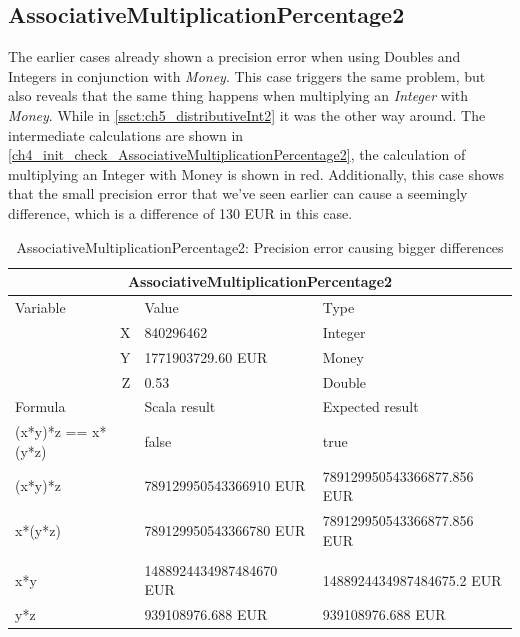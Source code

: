 \subsection{AssociativeMultiplicationPercentage2}
The earlier cases already shown a precision error when using Doubles and Integers in conjunction with \textit{Money}. This case triggers the same problem, but also reveals that the same thing happens when multiplying an \textit{Integer} with \textit{Money}. While in \autoref{ssct:ch5_distributiveInt2} it was the other way around. The intermediate calculations are shown in \autoref{ch4_init_check_AssociativeMultiplicationPercentage2}, the calculation of multiplying an Integer with Money is shown in red. Additionally, this case shows that the small precision error that we've seen earlier can cause a seemingly difference, which is a difference of 130 EUR in this case.
\\
\begin{table}[h!]
\centering
\begin{tabular}{lll}
\hline
\multicolumn{3}{|c|}{AssociativeMultiplicationPercentage2}                                                            \\ \hline
\multicolumn{1}{|l}{Variable}           & Value                   & \multicolumn{1}{l|}{Type}                       \\
\multicolumn{1}{|r}{X}                  & 840296462               & \multicolumn{1}{l|}{Integer}                    \\
\multicolumn{1}{|r}{Y}                  & 1771903729.60 EUR       & \multicolumn{1}{l|}{Money}                      \\
\multicolumn{1}{|r}{Z}                  & 0.53                    & \multicolumn{1}{l|}{Double}                     \\ \hline
\multicolumn{1}{|l}{Formula}            & Scala result            & \multicolumn{1}{l|}{Expected result}            \\
\multicolumn{1}{|l}{(x*y)*z == x*(y*z)} & false                   & \multicolumn{1}{l|}{true}                       \\
\multicolumn{1}{|l}{(x*y)*z}            & 789129950543366910 EUR  & \multicolumn{1}{l|}{789129950543366877.856 EUR} \\
\multicolumn{1}{|l}{x*(y*z)}            & 789129950543366780 EUR  & \multicolumn{1}{l|}{789129950543366877.856 EUR} \\
\multicolumn{1}{|l}{}                   &                         & \multicolumn{1}{l|}{}                           \\
\multicolumn{1}{|l}{x*y}                & 1488924434987484670 EUR & \multicolumn{1}{l|}{1488924434987484675.2 EUR}  \\
\multicolumn{1}{|l}{y*z}                & 939108976.688 EUR       & \multicolumn{1}{l|}{939108976.688 EUR}          \\ \hline
\end{tabular}
\caption{AssociativeMultiplicationPercentage2: Precision error causing bigger differences}
\label{ch4_init_check_AssociativeMultiplicationPercentage2}
\end{table}
\\

